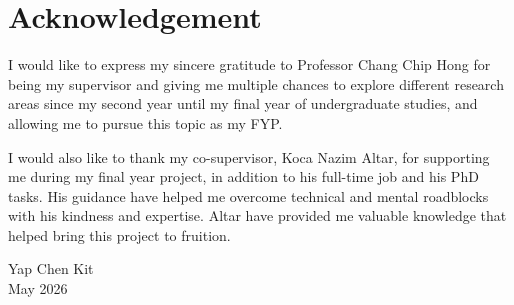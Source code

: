 
\chapter*{Acknowledgement}

I would like to express my sincere gratitude to Professor Chang Chip Hong 
for being my supervisor and giving me multiple chances
to explore different research areas since my second year until my final year of
undergraduate studies, and allowing me to pursue this topic as my FYP. 

I would also like to thank my co-supervisor, Koca Nazim Altar, for supporting
me during my final year project, in addition to his full-time job and his PhD tasks. 
His guidance have helped me overcome technical and mental roadblocks with his kindness 
and expertise. Altar have provided me valuable knowledge that helped bring this project
to fruition.

\vspace{1cm}
\noindent Yap Chen Kit\\
\noindent May 2026
